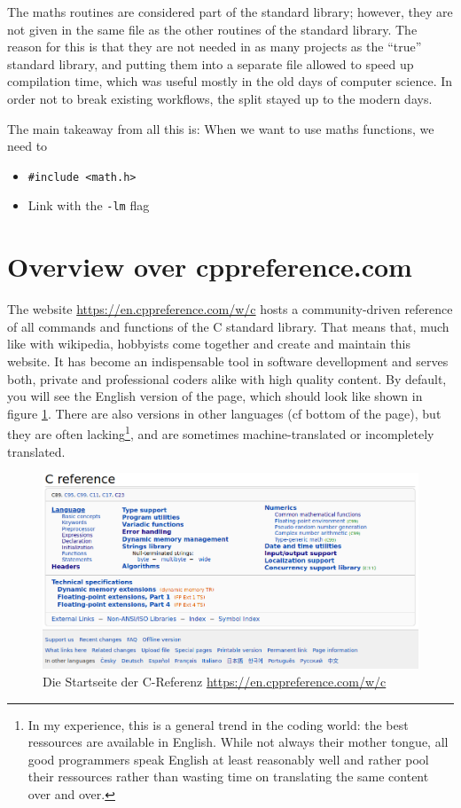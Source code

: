 The maths routines are considered part of the standard library; however, they are not given in the same file as the other routines of the standard library. The reason for this is that they are not needed in as many projects as the \enquote{true} standard library, and putting them into a separate file allowed to speed up compilation time, which was useful mostly in the old days of computer science. In order not to break existing workflows, the split stayed up to the modern days.

The main takeaway from all this is: When we want to use maths functions, we need to
\begin{itemize}
\item \texttt{\#include <math.h>}
\item Link with the \texttt{-lm} flag
\end{itemize}

\section{Overview over cppreference.com}
The website \url{https://en.cppreference.com/w/c} hosts a community-driven reference of all commands and functions of the C standard library. That means that, much like with wikipedia, hobbyists come together and create and maintain this website. It has become an indispensable tool in software devellopment and serves both, private and professional coders alike with high quality content. By default, you will see the English version of the page, which should look like shown in figure \ref{fig:cpp-home}. There are also versions in other languages (cf bottom of the page), but they are often lacking\footnote{In my experience, this is a general trend in the coding world: the best ressources are available in English. While not always their mother tongue, all good programmers speak English at least reasonably well and rather pool their ressources rather than wasting time on translating the same content over and over.}, and are sometimes machine-translated or incompletely translated.

\begin{figure}
	\includegraphics[width=\linewidth]{./gfx/cpp-home}
	\caption{Die Startseite der C-Referenz \url{https://en.cppreference.com/w/c}} \label{fig:cpp-home}
\end{figure}

